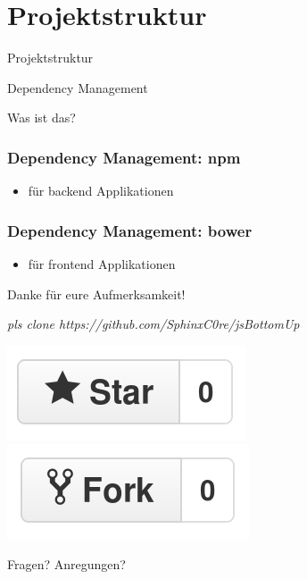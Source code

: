 \documentclass{beamer}
\begin{document}

\section{Projektstruktur}

\begin{frame}
\Huge{
\centerline{Projektstruktur}
}
\end{frame}


\begin{frame}
\Huge{
\centerline{Dependency Management}
\centerline{{\small Was ist das?}}
}
\end{frame}


\begin{frame}
\frametitle{Dependency Management: npm}
\begin{itemize}
\item für backend Applikationen
\end{itemize}
\end{frame}


\begin{frame}
\frametitle{Dependency Management: bower}
\begin{itemize}
\item für frontend Applikationen
\end{itemize}
\end{frame}






\begin{frame}
\Huge{\centerline{Danke für eure Aufmerksamkeit!}}

\begin{normalsize}

\centerline{\textit{pls clone https://github.com/SphinxC0re/jsBottomUp}}
\centerline{\includegraphics[scale=0.2]{assets/like_button.png} \includegraphics[scale=0.2]{assets/dislike_button.png}}
\end{normalsize}
\end{frame}

\begin{frame}
\Huge{\centerline{Fragen? Anregungen?}}
\end{frame}

\end{document}
